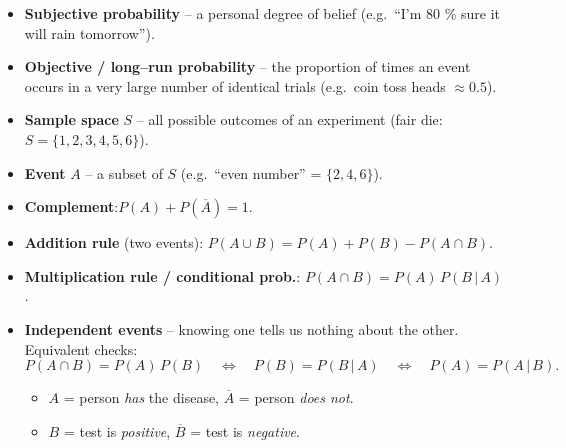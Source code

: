 \documentclass[12pt]{book}
\begin{document}
\newpage
\pagestyle{fancy}

\begin{itemize}

\item \textbf{Subjective probability} – a personal degree of belief  
      (e.g.\ “I’m 80 \% sure it will rain tomorrow”).
\item \textbf{Objective / long–run probability} – the proportion of times an event occurs
      in a very large number of identical trials (e.g.\ coin toss heads $\approx 0.5$).

\item \textbf{Sample space} $S$ – all possible outcomes of an experiment  
      (fair die: $S=\{1,2,3,4,5,6\}$).
\item \textbf{Event} $A$ – a subset of $S$ (e.g.\ “even number” = $\{2,4,6\}$).

\item \textbf{Complement}:\quad $P(A)+P(\overline{A}) = 1$.
\item \textbf{Addition rule} (two events):\quad
      $P(A\cup B)=P(A)+P(B)-P(A\cap B)$.
\item \textbf{Multiplication rule / conditional prob.}:\quad
      $P(A\cap B)=P(A)\,P(B\,|\,A)$.

\item \textbf{Independent events} – knowing one tells us nothing about the other.
      Equivalent checks:  
      \[
        P(A\cap B)=P(A)\,P(B)\quad\Longleftrightarrow\quad
        P(B)=P(B\,|\,A)\quad\Longleftrightarrow\quad
        P(A)=P(A\,|\,B).
      \]

\begin{itemize}
  \item $A$ = person \emph{has} the disease, $\overline{A}$ = person \emph{does not}.
  \item $B$ = test is \emph{positive}, $\overline{B}$ = test is \emph{negative}.
\end{itemize}


\end{itemize}
\end{document}
